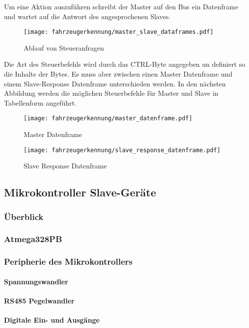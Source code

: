 Um eine Aktion auszuführen schreibt der Master auf den Bus ein Datenframe und wartet auf die Antwort des angesprochenen Slaves. 

\begin{figure}[H]
    \centering
    \texttt{[image: fahrzeugerkennung/master\_slave\_dataframes.pdf]}
    \caption{Ablauf von Steueranfragen}
\end{figure}

Die Art des Steuerbefehls wird durch das CTRL-Byte angegeben un definiert so die Inhalte der Bytes. Es muss aber zwischen einen Master Datenframe und einem Slave-Response Datenframe unterschieden werden. 
In den nächsten Abbildung werden die möglichen Steuerbefehle für Master und Slave in Tabellenform angeführt.

\begin{sidewaysfigure}
    \centering
    \texttt{[image: fahrzeugerkennung/master\_datenframe.pdf]}
    \caption{Master Datenframe}
\end{sidewaysfigure}

\begin{sidewaysfigure}
    \centering
    \texttt{[image: fahrzeugerkennung/slave\_response\_datenframe.pdf]}
    \caption{Slave Response Datenframe}
\end{sidewaysfigure}


\subsection{Mikrokontroller Slave-Geräte}
\subsubsection{Überblick}
\subsubsection{Atmega328PB}
\subsubsection{Peripherie des Mikrokontrollers}
\paragraph{Spannungswandler}
\paragraph{RS485 Pegelwandler}
\paragraph{Digitale Ein- und Ausgänge}
